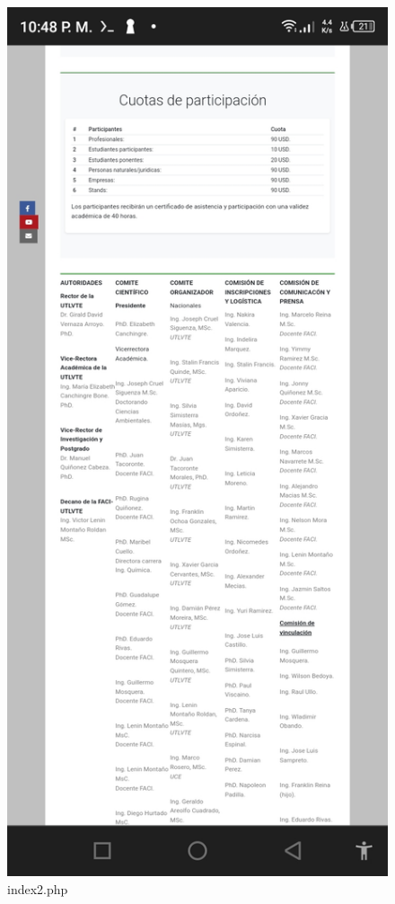 \documentclass[a4paper,14px]{article}
\begin{document}
\hspace{0.5cm}
        \begin{minipage}[H]{0.45\linewidth}
\begin{figure}[H]
  \centering
  \includegraphics[scale=0.3]{index4.jpg}
  \caption{index2.php }
  \label{fig:arquitectura2}
\end{figure}
  
\end{minipage}
\end{document}
